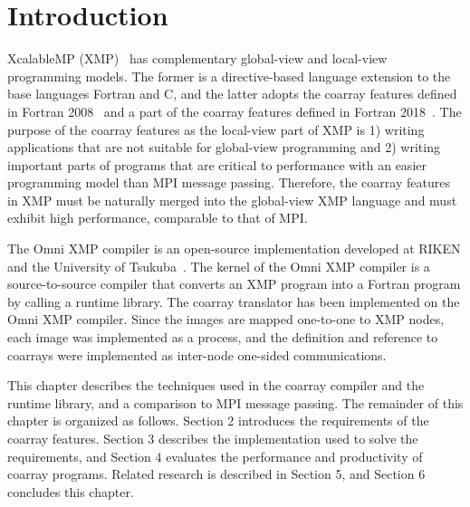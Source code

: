 \section{Introduction}\label{chap:intro}

\setcounter{page}{1}

XcalableMP (XMP)~\cite{xmp} has complementary global-view and local-view 
programming models. The former is a directive-based language 
extension to the base languages Fortran and C, and the latter adopts 
the coarray features defined in Fortran 2008~\cite{coarray} and 
a part of the coarray features defined in Fortran 2018~\cite{coarray18}. 
%
The purpose of the coarray features as the local-view part of XMP is 
1) writing applications that are not suitable for global-view programming
and 2) writing important parts of programs that are critical to performance
with an easier programming model than MPI message passing.
Therefore, the coarray features in XMP must be naturally merged into the 
global-view XMP language and must exhibit high performance, comparable to that of MPI.

The Omni XMP compiler is an open-source implementation developed at RIKEN 
and the University of Tsukuba~\cite{omni}. 
The kernel of the Omni XMP compiler is a source-to-source compiler that 
converts an XMP program into a Fortran program by calling a runtime library.
%
The coarray translator has been implemented on the Omni XMP compiler.
Since the images are mapped one-to-one to XMP nodes, 
each image was implemented as a process, and the definition and reference 
to coarrays were implemented as inter-node one-sided communications.

This chapter describes the techniques used in the coarray compiler and 
the runtime library, and a comparison to MPI message passing.
The remainder of this chapter is organized as follows. 
Section 2 introduces the requirements of the coarray features.
Section 3 describes the implementation used to solve the requirements, and
Section 4 evaluates the performance and productivity of coarray programs.
Related research is described in Section 5, and Section 6 concludes this chapter.

